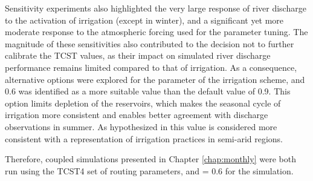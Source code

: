 Sensitivity experiments also highlighted the very large response of river discharge to the activation of irrigation (except in winter), and a significant yet more moderate response to the atmospheric forcing used for the parameter tuning. 
The magnitude of these sensitivities also contributed to the decision not to further calibrate the TCST values, as their impact on simulated river discharge performance remains limited compared to that of irrigation.
As a consequence, alternative options were explored for the \betairrig parameter of the irrigation scheme, and 0.6 was identified as a more suitable value than the default value of 0.9. This option limits depletion of the reservoirs, which makes the seasonal cycle of irrigation more consistent and enables better agreement with discharge observations in summer. As hypothesized in \citet{arboleda-obando_validation_2024} this value is considered more consistent with a representation of irrigation practices in semi-arid regions.

Therefore, coupled simulations presented in Chapter \ref{chap:monthly} were both run using the TCST4 set of routing parameters, and \betairrig = 0.6 for the \irr simulation.
